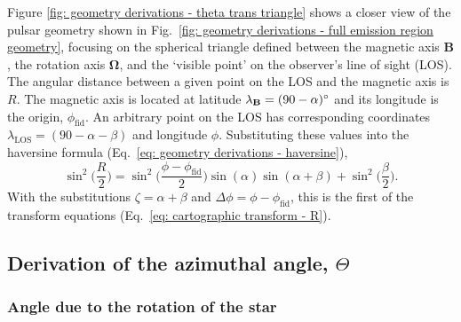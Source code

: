Figure \ref{fig: geometry derivations - theta trans triangle} shows a closer view of the pulsar geometry shown in Fig.~\ref{fig: geometry derivations - full emission region geometry}, focusing on the spherical triangle defined between the magnetic axis $\mathbf{B}$, the rotation axis $\mathbf{\Omega}$, and the `visible point' on the observer's line of sight (LOS). The angular distance between a given point on the LOS and the magnetic axis is $R$. The magnetic axis is located at latitude $\lambda_\mathbf{B} = (90-\alpha)^\circ$ and its longitude is the origin, $\phi_\mathrm{fid}$. An arbitrary point on the LOS has corresponding coordinates $\lambda_\mathrm{LOS} = (90 - \alpha - \beta)$ and longitude $\phi$. Substituting these values into the haversine formula (Eq.~\eqref{eq: geometry derivations - haversine}),
\begin{equation}
    \sin^2\bigg(\frac{R}{2}\bigg) = \sin^2\bigg(\frac{\phi - \phi_\mathrm{fid}}{2}\bigg) \sin(\alpha)\sin(\alpha + \beta) + \sin^2\bigg(\frac{\beta}{2}\bigg) \label{eq: geometry derivations - derived R}.
\end{equation}
With the substitutions $\zeta = \alpha + \beta$ and $\Delta\phi = \phi - \phi_\mathrm{fid}$, this is the first of the transform equations (Eq.~\eqref{eq: cartographic transform - R}).













\subsection{Derivation of the azimuthal angle, \texorpdfstring{$\Theta$}{Theta}}
\label{app: geometry derivations - cartographic transforms - derivation of Theta}

\subsubsection{Angle due to the rotation of the star}
\label{app: geometry derivations - cartographic transforms - derivation of Theta - theta trans}

